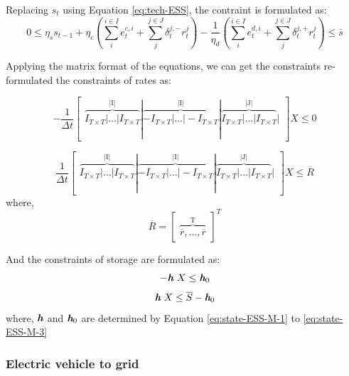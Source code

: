 Replacing $s_t$ using Equation \eqref{eq:tech-ESS}, the contraint is formulated as:
 \begin{equation}
0 \leq \eta_s s_{t-1} + \eta_c (\sum_{i}^{i \in I} e_t^{c,i} + \sum_{j}^{j \in J}\delta_t^{j,-}r_t^j)- \frac{1}{\eta_d} (\sum_{i}^{i \in I} e_t^{d,i} + \sum_{j}^{j \in J}\delta_t^{j,+}r_t^j) \leq \overline{s}
 \end{equation}
 
 Applying the matrix format of the equations, we can get the constraints re-formulated the constraints of rates as:
 
 \begin{equation}
- \frac{1}{\Delta t} \begin{bmatrix}
\overbrace{ I_{T\times T}|\dots|I_{T\times T}}^\text{|I|}|\overbrace{- I_{T\times T}|\dots|-I_{T\times T}}^\text{|I|}|\overbrace{ I_{T\times T}|\dots|I_{T\times T}}^\text{|J|}| 
\end{bmatrix} X \leq 0
 \end{equation}

 \begin{equation}
 \label{constraint:ESS-capacity}
\frac{1}{\Delta t} \begin{bmatrix}
\overbrace{ I_{T\times T}|\dots|I_{T\times T}}^\text{|I|}|\overbrace{- I_{T\times T}|\dots|-I_{T\times T}}^\text{|I|}|\overbrace{ I_{T\times T}|\dots|I_{T\times T}}^\text{|J|}| 
\end{bmatrix}X \leq \overline{R}
\end{equation}
where,
\begin{equation*}
\overline{R} = \begin{bmatrix}
\overbrace{\overline{r}, \dots, \overline{r}}^\text{T}
\end{bmatrix}^T
\end{equation*}

And the constraints of storage are formulated as:
\begin{equation}
 \label{constraint:ESS-energy-1}
-\textit{\textbf{h}}~X \leq \textit{\textbf{h}}_0
\end{equation}
\begin{equation}
 \label{constraint:ESS-energy-2}
\textit{\textbf{h}}~X \leq \overline{S} -  \textit{\textbf{h}}_0
\end{equation}
where, $\textit{\textbf{h}}$ and $\textit{\textbf{h}}_0$ are determined by Equation \eqref{eq:state-ESS-M-1} to \eqref{eq:state-ESS-M-3}

\subsubsection{Electric vehicle to grid}


